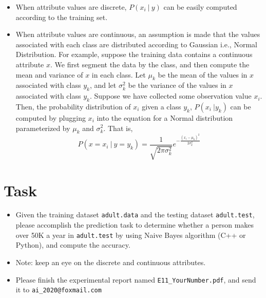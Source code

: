 \documentclass[a4paper, 11pt]{article}
\begin{document}
\begin{itemize}
	\item When attribute values are discrete, $P(x_i\ |\ y)$ can be easily computed according to the training set.
	\item When attribute values are continuous, an assumption is made that the values associated with each class are distributed according to Gaussian i.e., Normal Distribution. For example, suppose the training data contains a continuous attribute $x$. We first segment the data by the class, and then compute the mean and variance of $x$ in each class. Let $\mu_k$ be the mean of the values in $x$ associated with class $y_k$, and let $\sigma_k^2$ be the variance of the values in $x$ associated with class $y_k$. Suppose we have collected some observation value $x_i$. Then, the probability distribution of $x_i$ given a class $y_k$, $P(x_i\ | y_k)$ can be computed by plugging $x_i$ into the equation for a Normal distribution parameterized by $\mu_k$ and $\sigma_k^2$. That is,
	$$P(x=x_i\ |\ y=y_k)=\frac{1}{\sqrt{2\pi\sigma_k^2}}e^{-\frac{(x_i-\mu_k)^2}{2\sigma_k^2}}$$
    
\end{itemize}

\section{Task}
\begin{itemize}
\item Given the training dataset \texttt{adult.data} and the testing dataset \texttt{adult.test}, please accomplish the prediction task to determine whether a person makes over 50K a year in \texttt{adult.test} by using Naive Bayes algorithm (C++ or Python), and compute the accuracy. 
\item Note: keep an eye on the discrete and continuous attributes.
\item Please finish the experimental report named \texttt{E11\_YourNumber.pdf}, and send it to \texttt{ai\_2020@foxmail.com}
\end{itemize}
\end{document}
